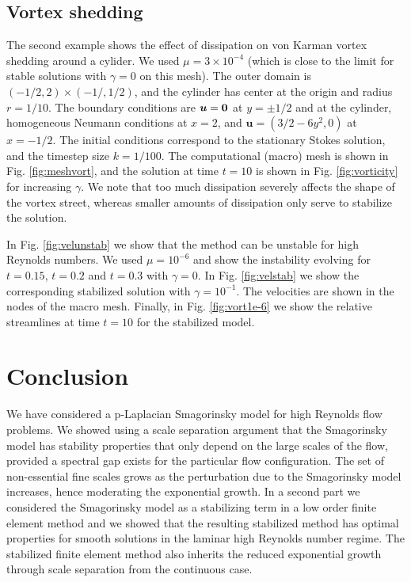 \documentclass[10pt]{amsart}
\numberwithin{equation}{section}
\theoremstyle{definition}
\theoremstyle{remark}
\renewcommand{\(}{\bigl(}
\renewcommand{\)}{\bigr)}
\newcommand{\bld}[1]{\boldsymbol{#1}}
\newcommand{\bu}{\bld{u}}
\begin{document}
\subsection{Vortex shedding} The second example shows the effect of dissipation on von Karman vortex shedding around a cylider.
We used $\mu = 3\times 10^{-4}$ (which is close to the limit for stable solutions with $\gamma=0$ on this mesh). The outer domain is 
$(-1/2,2)\times (-1/,1/2)$, and the cylinder has center at the origin and radius $r=1/10$. The boundary conditions are $\bu = \bf 0$ at $y=\pm 1/2$ and at the cylinder, homogeneous Neumann conditions at $x =2$, and $\bu =(3/2-6 y^2,0)$ at $x=-1/2$. The initial conditions correspond to the stationary Stokes solution,
and the timestep size $k=1/100$. The computational (macro) mesh is shown in Fig. \ref{fig:meshvort}, and the solution at time $t=10$ is shown in Fig. \ref{fig:vorticity} for increasing $\gamma$. We note that too much dissipation severely affects the shape of the vortex street, whereas smaller amounts of dissipation only serve to stabilize the solution. 

In Fig. \ref{fig:velunstab} we show that the method can be unstable for high Reynolds numbers. We used $\mu=10^{-6}$ and show the instability evolving for $t=0.15$, $t=0.2$ and $t=0.3$ with $\gamma=0$. In Fig. \ref{fig:velstab} we show the corresponding stabilized solution with $\gamma=10^{-1}$. The velocities are shown in the nodes of the macro mesh. Finally, in Fig. \ref{fig:vort1e-6} we show the relative streamlines at time $t=10$ for the stabilized model.

\section{Conclusion}
We have considered a p-Laplacian Smagorinsky model for high
Reynolds flow problems. We showed using a scale separation
argument that the Smagorinsky model has stability properties that only
depend on the large scales of the flow, provided a spectral gap exists
for the particular flow configuration. The set of
non-essential fine scales grows as the perturbation due to the
Smagorinsky model increases, hence moderating the exponential growth.
In a second part we considered the Smagorinsky model as a stabilizing
term in a low order finite element method and we showed that the resulting
stabilized method has optimal properties for smooth solutions in the
laminar high Reynolds number regime. 
The stabilized finite element method also inherits the reduced exponential growth through scale
separation from the continuous case. 
\end{document}
